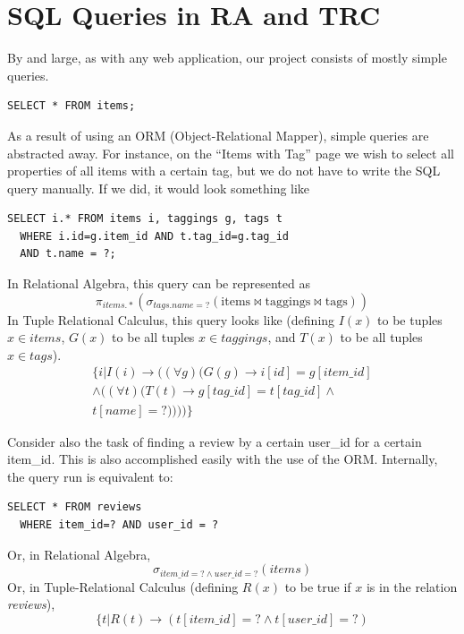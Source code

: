 \documentclass{acm_proc_article-sp}
\begin{document}
\section{SQL Queries in RA and TRC}
By and large, as with any web application, our project consists of mostly simple queries. 
\begin{centering}
\lstset{language=SQL}
\begin{lstlisting}
SELECT * FROM items;
\end{lstlisting}
\end{centering}

As a result of using an ORM (Object-Relational Mapper), simple queries are abstracted away. 
For instance, on the ``Items with Tag'' page we wish to select all properties of
all items with a certain tag, but we do not have to write the SQL query manually. If we did, it would look something
like
\lstset{language=SQL}
\begin{lstlisting}
SELECT i.* FROM items i, taggings g, tags t 
  WHERE i.id=g.item_id AND t.tag_id=g.tag_id 
  AND t.name = ?;
\end{lstlisting}

In Relational Algebra, this query can be represented as
\[ \pi_{items.*}(\sigma_{tags.name=?}(\text{items}\bowtie\text{taggings}\bowtie\text{tags})) \]
In Tuple Relational Calculus, this query looks like (defining $I(x)$ to be tuples $x \in \textit{items}$,
$G(x)$ to be all tuples $x \in \textit{taggings}$, and $T(x)$ to be all tuples $x \in \textit{tags}$).
\begin{displaymath}
\begin{split} 
\{i | I(i) \to ((\forall g)(G(g) \to i[id] = g[item\_id] \\
\land ((\forall t)(T(t) \to g[tag\_id] = t[tag\_id] \land \\
t[name] = ?))))\}
\end{split}
\end{displaymath}

Consider also the task of finding a review by a certain user\_id for a certain item\_id. This is also
accomplished easily with the use of the ORM. Internally, the query run is equivalent to:
\begin{lstlisting}
SELECT * FROM reviews 
  WHERE item_id=? AND user_id = ?
\end{lstlisting}
Or, in Relational Algebra,
\[ \sigma_{item\_id=? \land user\_id=?}(\textit{items}) \]
Or, in Tuple-Relational Calculus (defining $R(x)$ to be true if $x$ is in the relation \textit{reviews}),
\[ \{ t | R(t) \to (t[item\_id]=? \land t[user\_id]=?) \]
\end{document}
